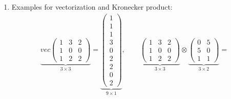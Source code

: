 \begin{enumerate}
\item Examples for vectorization and Kronecker product:
\begin{align*}
\underbrace{vec\begin{pmatrix} 1&3&2\\1&0&0\\1&2&2 \end{pmatrix}}_{3\times3} = \underbrace{\begin{pmatrix} 1 \\1 \\1 \\3 \\0 \\2 \\2 \\ 0 \\2\end{pmatrix}}_{9\times1}, \qquad 
\underbrace{\begin{pmatrix} 1&3&2\\1&0&0\\1&2&2 \end{pmatrix}}_{3\times3} \otimes \underbrace{\begin{pmatrix}0&5\\5&0\\1&1 \end{pmatrix}}_{3\times2} =

\end{align*}
\end{enumerate}
